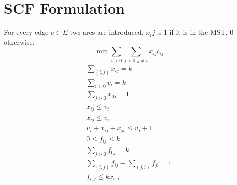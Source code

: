 \documentclass[a4paper]{article}
\begin{document}
\section{SCF Formulation}
For every edge $e \in E$ two arcs are introduced. $x_ij$ is $1$ if it is in the MST, $0$ otherwise.
\begin{equation}
	\min \sum_{i>0}{ \sum_{j>0,j\not =i}{x_{ij}c_{ij}}}
\end{equation}
\begin{align}
	\sum_{(i,j)} x_{ij} = k\\
	\sum_{i>0}v_i =k \\
	\sum_{j>0} x_{0j}=1\\
	x_{ij} \leq v_i\\
	x_{ij} \leq v_i\\
	v_i + x_{ij} + x_{ji} \leq v_j + 1\\
	0 \leq f_{ij} \leq k\\
	\sum_{j>0} f_{0j}=k \\
	\sum_{(i,j)} f_{ij} - \sum_{(j,i)} f_{ji} = 1\\
	f_{i,j}\leq kx_{i,j}
\end{align}
\end{document}
